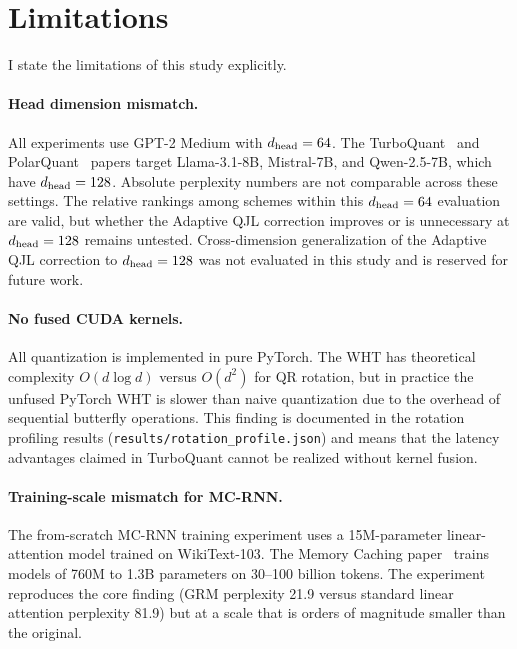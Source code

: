 
\section{Limitations}
\label{sec:limitations}

I state the limitations of this study explicitly.

\paragraph{Head dimension mismatch.}
All experiments use GPT-2 Medium with $d_{\text{head}} = 64$.
The TurboQuant~\cite{zandieh2025turboquant} and
PolarQuant~\cite{han2025polarquant} papers target Llama-3.1-8B,
Mistral-7B, and Qwen-2.5-7B, which have $d_{\text{head}} = 128$.
Absolute perplexity numbers are not comparable across these settings.
The relative rankings among schemes within this $d_{\text{head}} = 64$ evaluation
are valid, but whether the Adaptive QJL correction improves or is
unnecessary at $d_{\text{head}} = 128$ remains untested.
Cross-dimension generalization of the Adaptive QJL correction to
$d_{\text{head}} = 128$ was not evaluated in this study and is reserved for
future work.

\paragraph{No fused CUDA kernels.}
All quantization is implemented in pure PyTorch.
The WHT has theoretical complexity $O(d \log d)$ versus $O(d^2)$ for
QR rotation, but in practice the unfused PyTorch WHT is slower than
naive quantization due to the overhead of sequential butterfly
operations.
This finding is documented in the rotation profiling results
(\texttt{results/rotation\_profile.json}) and means that the latency
advantages claimed in TurboQuant cannot be realized without kernel
fusion.

\paragraph{Training-scale mismatch for MC-RNN.}
The from-scratch MC-RNN training experiment uses a 15M-parameter
linear-attention model trained on WikiText-103.
The Memory Caching paper~\cite{behrouz2026mc} trains models of
760M to 1.3B parameters on 30--100 billion tokens.
The experiment reproduces the core finding (GRM perplexity 21.9 versus
standard linear attention perplexity 81.9) but at a scale that is
orders of magnitude smaller than the original.

